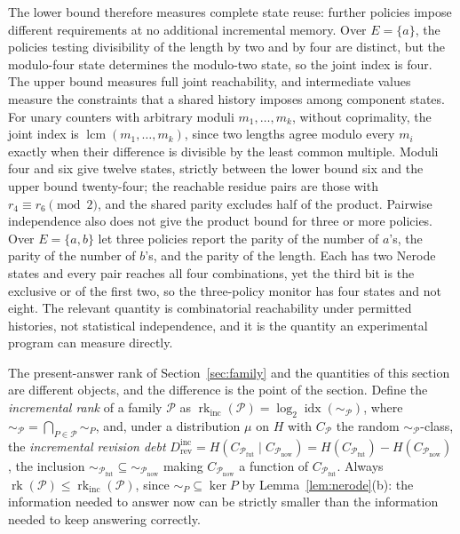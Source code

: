 \documentclass[11pt]{article}
\theoremstyle{definition}
\theoremstyle{remark}
\newcommand{\Ev}{E}
\newcommand{\Hist}{H}
\newcommand{\Pol}{\mathcal{P}}
\newcommand{\Fut}{\mathcal{P}_{\mathrm{fut}}}
\newcommand{\Now}{\mathcal{P}_{\mathrm{now}}}
\newcommand{\nerode}[1]{\sim_{#1}}
\newcommand{\idx}{\operatorname{idx}}
\newcommand{\rank}{\operatorname{rk}}
\begin{document}
The lower bound therefore measures complete state reuse: further policies impose different requirements at no additional incremental memory. Over $\Ev=\{a\}$, the policies testing divisibility of the length by two and by four are distinct, but the modulo-four state determines the modulo-two state, so the joint index is four. The upper bound measures full joint reachability, and intermediate values measure the constraints that a shared history imposes among component states. For unary counters with arbitrary moduli $m_1,\dots,m_k$, without coprimality, the joint index is $\operatorname{lcm}(m_1,\dots,m_k)$, since two lengths agree modulo every $m_i$ exactly when their difference is divisible by the least common multiple. Moduli four and six give twelve states, strictly between the lower bound six and the upper bound twenty-four; the reachable residue pairs are those with $r_4\equiv r_6\pmod 2$, and the shared parity excludes half of the product. Pairwise independence also does not give the product bound for three or more policies. Over $\Ev=\{a,b\}$ let three policies report the parity of the number of $a$'s, the parity of the number of $b$'s, and the parity of the length. Each has two Nerode states and every pair reaches all four combinations, yet the third bit is the exclusive or of the first two, so the three-policy monitor has four states and not eight. The relevant quantity is combinatorial reachability under permitted histories, not statistical independence, and it is the quantity an experimental program can measure directly.

The present-answer rank of Section~\ref{sec:family} and the quantities of this section are different objects, and the difference is the point of the section. Define the \emph{incremental rank} of a family $\Pol$ as $\rank_{\mathrm{inc}}(\Pol)=\log_2\idx(\nerode{\Pol})$, where $\nerode{\Pol}=\bigcap_{P\in\Pol}\nerode{P}$, and, under a distribution $\mu$ on $\Hist$ with $C_{\Pol}$ the random $\nerode{\Pol}$-class, the \emph{incremental revision debt} $D^{\mathrm{inc}}_{\mathrm{rev}}=H(C_{\Fut}\mid C_{\Now})=H(C_{\Fut})-H(C_{\Now})$, the inclusion $\nerode{\Fut}\subseteq\nerode{\Now}$ making $C_{\Now}$ a function of $C_{\Fut}$. Always $\rank(\Pol)\le\rank_{\mathrm{inc}}(\Pol)$, since $\nerode{P}\subseteq\ker P$ by Lemma~\ref{lem:nerode}(b): the information needed to answer now can be strictly smaller than the information needed to keep answering correctly.
\end{document}

